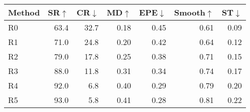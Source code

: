 \begin{tabular}{lrrrrrr}
\toprule
Method & SR$\uparrow$ & CR$\downarrow$ & MD$\uparrow$ & EPE$\downarrow$ & Smooth$\uparrow$ & ST$\downarrow$ \\
\midrule
R0 & 63.4 & 32.7 & 0.18 & 0.45 & 0.61 & 0.09 \\
R1 & 71.0 & 24.8 & 0.20 & 0.42 & 0.64 & 0.12 \\
R2 & 79.0 & 17.8 & 0.25 & 0.38 & 0.71 & 0.15 \\
R3 & 88.0 & 11.8 & 0.31 & 0.34 & 0.74 & 0.17 \\
R4 & 92.0 & 6.8 & 0.40 & 0.29 & 0.79 & 0.20 \\
R5 & 93.0 & 5.8 & 0.41 & 0.28 & 0.81 & 0.22 \\
\bottomrule
\end{tabular}